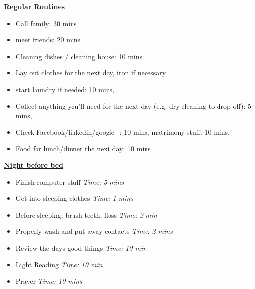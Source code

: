 \documentclass[serif,mathserif,final]{beamer}
\newcommand{\timeEst}[1]{\textit{Time:} \textit{#1}}
\begin{document}
\begin{frame}{}
\begin{columns}[t]
\begin{column}{0.20\linewidth}
\begin{block}{\small \textbf{\underline{Regular Routines}} }
\begin{itemize}
\tiny \item \tiny Call family: 30 mins
\item \tiny meet friends: 20 mins
\item \tiny Cleaning dishes / cleaning house: 10 mins
\item \tiny Lay out clothes for the next day, iron if necessary
\item \tiny start laundry if needed: 10 mins,
\item \tiny Collect anything you’ll need for the next day (e.g. dry cleaning to drop off): 5 mins,
\item \tiny Check Facebook/linkedin/google+: 10 mins, matrimony stuff: 10 mins,
\item \tiny Food for lunch/dinner the next day: 10 mins
\end{itemize}

\underline{\textbf{Night before bed}}
\begin{itemize}
\tiny \item \tiny Finish computer stuff \timeEst{5 mins}
\item \tiny Get into sleeping clothes \timeEst{1 mins}
\item \tiny Before sleeping: brush teeth, floss \timeEst{ 2 min}
\item \tiny Properly wash and put away contacts \timeEst{ 2 mins}
\item \tiny Review the days good things \timeEst{ 10 min}
\item \tiny Light Reading \timeEst{ 10 min}
\item \tiny Prayer \timeEst{10 mins}
\end{itemize}
\end{block}

\end{column}%

\end{columns} 

\end{frame} 
\end{document}
